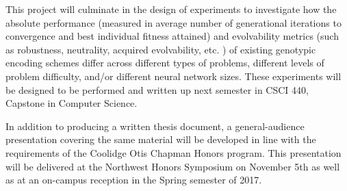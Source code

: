 \documentclass[a4paper]{article}
\begin{document}
This project will culminate in the design of experiments to investigate how the absolute performance (measured in average number of generational iterations to convergence and best individual fitness attained) and evolvability metrics (such as robustness, neutrality, acquired evolvability, etc. \cite{Richter2015EvolvabilitySurvey, ReisingerAcquiringRepresentations}) of existing genotypic encoding schemes differ across different types of problems, different levels of problem difficulty, and/or different neural network sizes. These experiments will be designed to be performed and written up next semester in CSCI 440, Capstone in Computer Science. 

In addition to producing a written thesis document, a general-audience presentation covering the same material will be developed in line with the requirements of the Coolidge Otis Chapman Honors program. This presentation will be delivered at the Northwest Honors Symposium on November 5th as well as at an on-campus reception in the Spring semester of 2017.

\clearpage
\printbibliography
\end{document}
